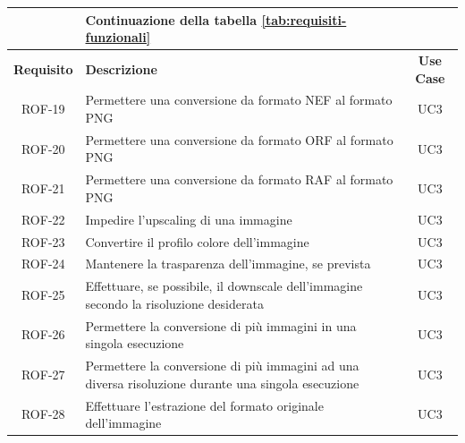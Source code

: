\begin{table}[H]
    \begin{tabularx}{\textwidth}{|c|X|c|}
        \hline

                                        & \centering \textbf{Continuazione della tabella
        \ref{tab:requisiti-funzionali}} &
        \\
        \hline
        \textbf{Requisito}              & \textbf{Descrizione}                                               & \textbf{Use Case} \\
        \hline
        ROF-19                          & Permettere una conversione da formato NEF al formato PNG           & UC3
        \\
        \hline
        ROF-20                          & Permettere una conversione da formato ORF al formato PNG           & UC3
        \\
        \hline
        ROF-21                          & Permettere una conversione da formato RAF al formato PNG           & UC3
        \\
        \hline
        ROF-22                          & Impedire l'upscaling di una immagine
                                        & UC3                                                                                    \\
        \hline
        ROF-23                          & Convertire il profilo colore dell'immagine
                                        & UC3                                                                                    \\
        \hline
        ROF-24                          & Mantenere la trasparenza dell'immagine, se prevista
                                        & UC3                                                                                    \\
        \hline
        ROF-25                          & Effettuare, se possibile, il downscale
        dell'immagine secondo la risoluzione desiderata
                                        & UC3                                                                                    \\
        \hline
        ROF-26                          & Permettere la conversione di più immagini in una
        singola esecuzione
                                        & UC3
        \\
        \hline
        ROF-27                          & Permettere la conversione di più immagini ad una
        diversa risoluzione durante una singola esecuzione
                                        & UC3
        \\
        \hline
        ROF-28                          & Effettuare l'estrazione del formato originale dell'immagine
                                        & UC3
        \\
        \hline


\end{tabularx}
\end{table}
